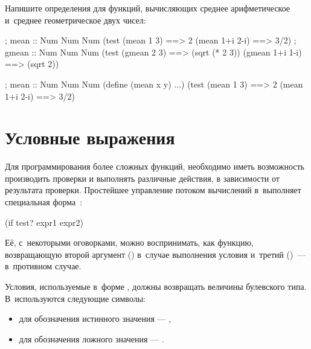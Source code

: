 \begin{Assignment}
Напишите определения для функций, вычисляющих среднее арифметическое и~среднее геометрическое двух чисел:

\begin{Specification}
  ; mean :: Num Num \arrow Num
  (test 
    (mean 1 3)     ==> 2
    (mean 1+i 2-i) ==> 3/2)%
  ; gmean :: Num Num \arrow Num
  (test 
    (gmean 2 3)     ==> (sqrt (* 2 3))
    (gmean 1+i 1-i) ==> (sqrt 2))
\end{Specification}

\begin{Specification}
  ; mean :: Num Num \arrow Num
  (define (mean x y)  ...)
  (test 
    (mean 1 3)     ==> 2
    (mean 1+i 2-i) ==> 3/2)
\end{Specification}%

\end{Assignment}

\section[2]{Условные выражения}%
Для программирования более сложных функций, необходимо иметь возможность производить проверки и выполнять различные действия, в зависимости от результата проверки. 
Простейшее управление потоком вычислений в~\Scheme выполняет специальная форма~:
\begin{SchemeCode}
(if test? expr1 expr2)
\end{SchemeCode}

\noindent Её, с~некоторыми оговорками, можно воспринимать, как функцию, возвращающую второй аргумент () в~случае выполнения условия  и~третий ()~--- в~противном случае.

Условия, используемые в~форме , должны возвращать величины булевского типа. В~\Scheme используются следующие символы:
\begin{itemize}[--]
 \item для обозначения истинного значения --- ,

 \item для обозначения ложного значения --- .
\end{itemize}

